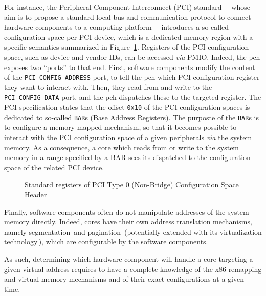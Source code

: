 For instance, the Peripheral Component Interconnect (PCI) standard ---whose aim
is to propose a standard local bus and communication protocol to connect
hardware components to a computing platform--- introduces a so-called
configuration space per PCI device, which is a dedicated memory region with a
specific semantics summarized in Figure~\ref{fig:usecase:pciconfig}.
%
Registers of the PCI configuration space, such as device and vendor IDs, can be
accessed \emph{via} PMIO.
%
Indeed, the \ac{pch} exposes two ``ports'' to that end.
%
First, software components modify the content of the
\texttt{PCI\_CONFIG\_ADDRESS} port, to tell the \ac{pch} which PCI configuration
register they want to interact with.
%
Then, they read from and write to the \texttt{PCI\_CONFIG\_DATA} port, and the
\ac{pch} dispatches these \IO to the targeted register.
%
The PCI specification states that the offset \texttt{0x10} of the PCI
configuration spaces is dedicated to so-called \texttt{BAR}s (Base Address
Registers).
%
The purposte of the \texttt{BAR}s is to configure a memory-mapped mechanism, so
that it becomes possible to interact with the PCI configuration space of a given
peripherals \emph{via} the system memory.
%
As a consequence, a core which reads from or write to the system memory in a
range specified by a BAR sees its \IO dispatched to the configuration space of
the related PCI device.

\begin{figure}
  \begin{center}
    \def\svgwidth{0.8\textwidth} \resizebox{0.6\textwidth}{!}{%
      }
  \end{center}
  \caption{Standard registers of PCI Type 0 (Non-Bridge) Configuration Space
    Header}
  \label{fig:usecase:pciconfig}
\end{figure}

Finally, software components often do not manipulate addresses of the system
memory directly.
%
Indeed, cores have their own address translation mechanisms, namely
segmentation\,\cite[Volume 3, Section 2.4]{intel2014manual} and
pagination\,\cite[Volume 3, Chapter 4]{intel2014manual} (potentially extended
with its virtualization technology\,\cite[Volume 3, Section
28.2]{intel2014manual}), which are configurable by the software components.

As such, determining which hardware component will handle a core \IO targeting a
given virtual address requires to have a complete knowledge of the x86 remapping
and virtual memory mechanisms and of their exact configurations at a given time.

